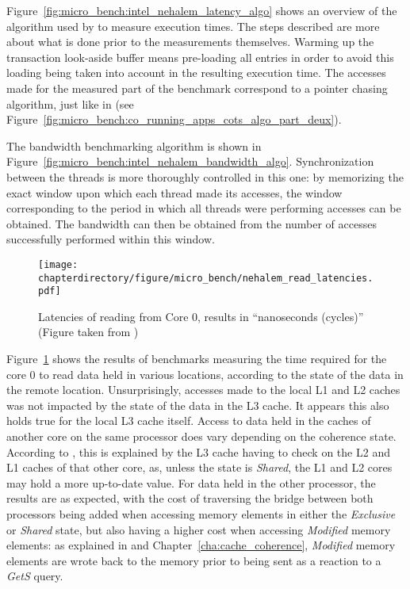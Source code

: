 Figure~\ref{fig:micro_bench:intel_nehalem_latency_algo} shows an overview of the
algorithm used by \cite{10.1109/PACT.2009.22} to measure execution times. The steps
described are more about what is done prior to the measurements themselves.
Warming up the transaction look-aside buffer means pre-loading all entries in
order to avoid this loading being taken into account in the resulting execution time.
The accesses made for the measured part of the benchmark correspond to a pointer
chasing algorithm, just like in \cite{10.1145/2086696.2086713} (see
Figure~\ref{fig:micro_bench:co_running_apps_cots_algo_part_deux}).

The bandwidth benchmarking algorithm is shown in
Figure~\ref{fig:micro_bench:intel_nehalem_bandwidth_algo}. Synchronization
between the threads is more thoroughly controlled in this one: by memorizing the
exact window upon which each thread made its accesses, the window corresponding
to the period in which all threads were performing accesses can be obtained.
The bandwidth can then be obtained from the number of accesses successfully
performed within this window.

\begin{figure}[hbt!]
\centering
\texttt{[image: \\chapterdirectory/figure/micro\_bench/nehalem\_read\_latencies.pdf]}
\caption{%
Latencies of reading from Core 0, results in ``nanoseconds (cycles)'' (Figure
taken from \cite{10.1109/PACT.2009.22})
}
\label{fig:micro_bench:intel_nehalem_read_latencies}
\end{figure}

Figure~\ref{fig:micro_bench:intel_nehalem_read_latencies} shows the results of
benchmarks measuring the time required for the core 0 to read data held in
various locations, according to the state of the data in the remote location.
Unsurprisingly, accesses made to the local L1 and L2 caches was not impacted by
the state of the data in the L3 cache. It appears this also holds true for the
local L3 cache itself. Access to data held in the caches of another core on the
same processor does vary depending on the coherence state. According to
\cite{10.1109/PACT.2009.22}, this is explained by the L3 cache having to check
on the L2 and L1 caches of that other core, as, unless the state is
\textit{Shared}, the L1 and L2 cores may hold a more up-to-date value. For data
held in the other processor, the results are as expected, with the cost of
traversing the bridge between both processors being added when accessing memory
elements in either the \textit{Exclusive} or \textit{Shared} state, but also
having a higher cost when accessing \textit{Modified} memory elements: as
explained in \cite{10.1109/PACT.2009.22} and Chapter~\ref{cha:cache_coherence},
\textit{Modified} memory elements are wrote back to the memory prior to being
sent as a reaction to a \textit{GetS} query.

